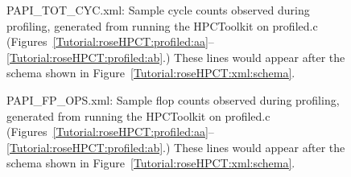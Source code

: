 \begin{figure}[!h]
{\indent
{\mySmallFontSize
\begin{latexonly}
   
\end{latexonly}

\begin{htmlonly}
   
\end{htmlonly}

}
}
\caption{PAPI\_TOT\_CYC.xml: Sample cycle counts observed during
profiling, generated from running the HPCToolkit on profiled.c
(Figures~\ref{Tutorial:roseHPCT:profiled:aa}--\ref{Tutorial:roseHPCT:profiled:ab}.)
These lines would appear after the schema shown in
Figure~\ref{Tutorial:roseHPCT:xml:schema}.}
\label{Tutorial:roseHPCT:xml:cycles}
\end{figure}

\begin{figure}[!h]
{\indent
{\mySmallFontSize
\begin{latexonly}
   
\end{latexonly}

\begin{htmlonly}
   
\end{htmlonly}

}
}
\caption{PAPI\_FP\_OPS.xml: Sample flop counts observed during
profiling, generated from running the HPCToolkit on profiled.c
(Figures~\ref{Tutorial:roseHPCT:profiled:aa}--\ref{Tutorial:roseHPCT:profiled:ab}.)
These lines would appear after the schema shown in
Figure~\ref{Tutorial:roseHPCT:xml:schema}.}
\label{Tutorial:roseHPCT:xml:flops}
\end{figure}

